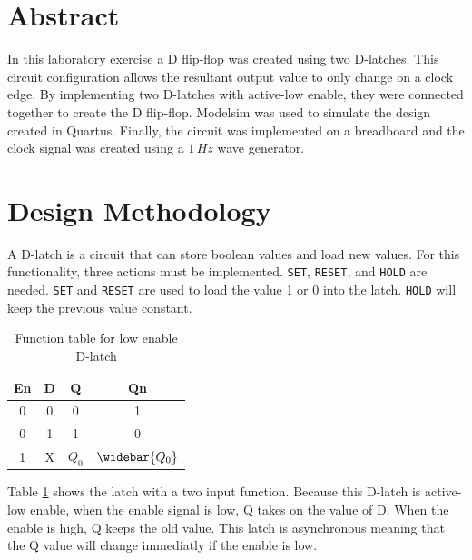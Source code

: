 \documentclass[CMPE]{KGCOEReport}
\begin{document}
\maketitle

\section*{Abstract}
In this laboratory exercise a D flip-flop was created using two D-latches. This circuit configuration allows the resultant output value to only change on a clock edge. By implementing two D-latches with active-low enable, they were connected together to create the D flip-flop. Modelsim was used to simulate the design created in Quartus. Finally, the circuit was implemented on a breadboard and the clock signal was created using a $1\,Hz$ wave generator.

\section*{Design Methodology}

A D-latch is a circuit that can store boolean values and load new values. For this functionality, three actions must be implemented. \texttt{SET}, \texttt{RESET}, and \texttt{HOLD} are needed. \texttt{SET} and \texttt{RESET} are used to load the value 1 or 0 into the latch. \texttt{HOLD} will keep the previous value constant.

\begin{table}[h!]
\renewcommand{\arraystretch}{1.2}
\setlength{\tabcolsep}{12pt}
\caption{Function table for low enable D-latch}
\begin{center}
\begin{tabular}{|c|c||c|c|}
\hline
En & D & Q & Qn\\\hline
0 & 0 & 0 & 1\\\hline
0 & 1 & 1 & 0\\\hline
1 & X & $Q_0$ & $\widebar{Q_0}$\\\hline

\end{tabular}
\end{center}
\label{tab:dlatch}
\end{table}

Table \ref{tab:dlatch} shows the latch with a two input function. Because this D-latch is active-low enable, when the enable signal is low, Q takes on the value of D. When the enable is high, Q keeps the old value. This latch is asynchronous meaning that the Q value will change immediatly if the enable is low.
\end{document}
